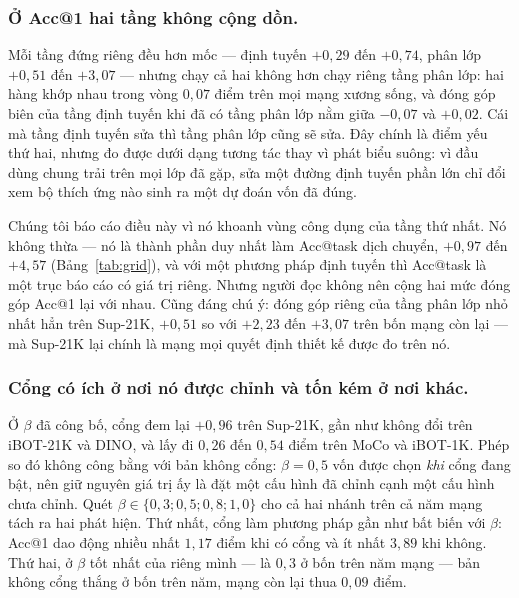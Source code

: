 \documentclass[runningheads]{llncs}
\begin{document}
\subsubsection{Ở Acc@1 hai tầng không cộng dồn.}
Mỗi tầng đứng riêng đều hơn mốc --- định tuyến $+0{,}29$ đến $+0{,}74$, phân lớp
$+0{,}51$ đến $+3{,}07$ --- nhưng chạy cả hai không hơn chạy riêng tầng phân lớp:
hai hàng khớp nhau trong vòng $0{,}07$ điểm trên mọi mạng xương sống, và đóng góp
biên của tầng định tuyến khi đã có tầng phân lớp nằm giữa $-0{,}07$ và $+0{,}02$.
Cái mà tầng định tuyến sửa thì tầng phân lớp cũng sẽ sửa. Đây chính là điểm yếu
thứ hai, nhưng đo được dưới dạng tương tác thay vì phát biểu suông: vì đầu dùng
chung trải trên mọi lớp đã gặp, sửa một đường định tuyến phần lớn chỉ đổi xem bộ
thích ứng nào sinh ra một dự đoán vốn đã đúng.

Chúng tôi báo cáo điều này vì nó khoanh vùng công dụng của tầng thứ nhất. Nó
không thừa --- nó là thành phần duy nhất làm Acc@task dịch chuyển, $+0{,}97$ đến
$+4{,}57$ (Bảng~\ref{tab:grid}), và với một phương pháp định tuyến thì Acc@task
là một trục báo cáo có giá trị riêng. Nhưng người đọc không nên cộng hai mức đóng
góp Acc@1 lại với nhau. Cũng đáng chú ý: đóng góp riêng của tầng phân lớp nhỏ
nhất hẳn trên Sup-21K, $+0{,}51$ so với $+2{,}23$ đến $+3{,}07$ trên bốn mạng còn
lại --- mà Sup-21K lại chính là mạng mọi quyết định thiết kế được đo trên nó.

\subsubsection{Cổng có ích ở nơi nó được chỉnh và tốn kém ở nơi khác.}
Ở $\beta$ đã công bố, cổng đem lại $+0{,}96$ trên Sup-21K, gần như không đổi trên
iBOT-21K và DINO, và lấy đi $0{,}26$ đến $0{,}54$ điểm trên MoCo và iBOT-1K. Phép
so đó không công bằng với bản không cổng: $\beta = 0{,}5$ vốn được chọn
\emph{khi} cổng đang bật, nên giữ nguyên giá trị ấy là đặt một cấu hình đã chỉnh
cạnh một cấu hình chưa chỉnh. Quét $\beta \in \{0{,}3; 0{,}5; 0{,}8; 1{,}0\}$ cho
cả hai nhánh trên cả năm mạng tách ra hai phát hiện. Thứ nhất, cổng làm phương
pháp gần như bất biến với $\beta$: Acc@1 dao động nhiều nhất $1{,}17$ điểm khi có
cổng và ít nhất $3{,}89$ khi không. Thứ hai, ở $\beta$ tốt nhất của riêng mình
--- là $0{,}3$ ở bốn trên năm mạng --- bản không cổng thắng ở bốn trên năm, mạng
còn lại thua $0{,}09$ điểm.
\end{document}
